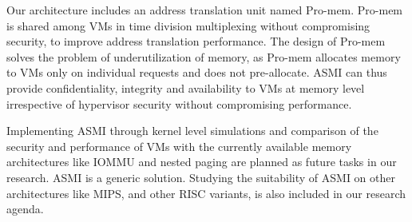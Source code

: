 \documentclass[a4paper,10pt,twocolumn]{article}
\begin{document}
  Our architecture includes an address translation unit named Pro-mem. Pro-mem is shared among VMs in time division multiplexing without compromising security,  to improve address translation performance. The design of Pro-mem solves the problem of underutilization of memory, as Pro-mem allocates memory to VMs only on individual requests and does not pre-allocate. ASMI  can thus provide confidentiality, integrity and availability to VMs at memory level irrespective of hypervisor security without compromising performance.

  Implementing ASMI through kernel level simulations  and comparison of  the security and performance of VMs with the currently available memory architectures like IOMMU and nested paging are planned as future tasks  in our research. ASMI is a generic solution. Studying  the  suitability of ASMI  on other architectures like MIPS, and other RISC variants, is also included in our research agenda.
  

\end{document}
